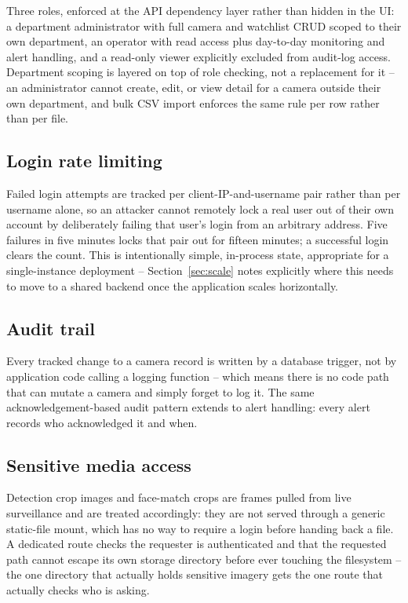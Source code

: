 \documentclass[11pt,a4paper]{article}
\begin{document}
Three roles, enforced at the API dependency layer rather than hidden in
the UI: a department administrator with full camera and watchlist CRUD
scoped to their own department, an operator with read access plus
day-to-day monitoring and alert handling, and a read-only viewer explicitly
excluded from audit-log access. Department scoping is layered on top of
role checking, not a replacement for it -- an administrator cannot create,
edit, or view detail for a camera outside their own department, and bulk
CSV import enforces the same rule per row rather than per file.

\subsection{Login rate limiting}

Failed login attempts are tracked per client-IP-and-username pair rather
than per username alone, so an attacker cannot remotely lock a real user
out of their own account by deliberately failing that user's login from an
arbitrary address. Five failures in five minutes locks that pair out for
fifteen minutes; a successful login clears the count. This is intentionally
simple, in-process state, appropriate for a single-instance deployment --
Section~\ref{sec:scale} notes explicitly where this needs to move to a
shared backend once the application scales horizontally.

\subsection{Audit trail}

Every tracked change to a camera record is written by a database trigger,
not by application code calling a logging function -- which means there is
no code path that can mutate a camera and simply forget to log it. The
same acknowledgement-based audit pattern extends to alert handling: every
alert records who acknowledged it and when.

\subsection{Sensitive media access}

Detection crop images and face-match crops are frames pulled from live
surveillance and are treated accordingly: they are not served through a
generic static-file mount, which has no way to require a login before
handing back a file. A dedicated route checks the requester is
authenticated and that the requested path cannot escape its own storage
directory before ever touching the filesystem -- the one directory that
actually holds sensitive imagery gets the one route that actually checks
who is asking.
\end{document}
